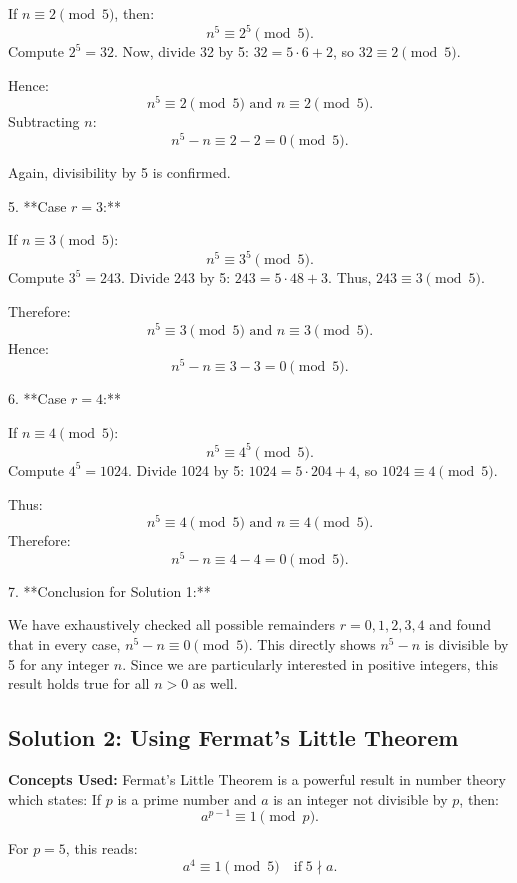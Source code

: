 \documentclass[12pt,a4paper]{article}
\begin{document}
   If $n \equiv 2 \pmod{5}$, then:
   \[
   n^5 \equiv 2^5 \pmod{5}.
   \]
   Compute $2^5=32$. Now, divide 32 by 5: $32=5\cdot6 + 2$, so $32 \equiv 2 \pmod{5}$.
   
   Hence:
   \[
   n^5 \equiv 2 \pmod{5} \text{ and } n \equiv 2 \pmod{5}.
   \]
   Subtracting $n$:
   \[
   n^5-n \equiv 2-2=0 \pmod{5}.
   \]

   Again, divisibility by 5 is confirmed.

   \medskip

5. **Case $r=3$:**
   
   If $n \equiv 3 \pmod{5}$:
   \[
   n^5 \equiv 3^5 \pmod{5}.
   \]
   Compute $3^5=243$. Divide 243 by 5: $243=5\cdot48 + 3$. Thus, $243 \equiv 3 \pmod{5}$.
   
   Therefore:
   \[
   n^5 \equiv 3 \pmod{5} \text{ and } n \equiv 3 \pmod{5}.
   \]
   Hence:
   \[
   n^5-n \equiv 3-3=0 \pmod{5}.
   \]

6. **Case $r=4$:**

\medskip
   
   If $n \equiv 4 \pmod{5}$:
   \[
   n^5 \equiv 4^5 \pmod{5}.
   \]
   Compute $4^5=1024$. Divide 1024 by 5: $1024=5\cdot204+4$, so $1024 \equiv 4 \pmod{5}$.
   
   Thus:
   \[
   n^5 \equiv 4 \pmod{5} \text{ and } n \equiv 4 \pmod{5}.
   \]
   Therefore:
   \[
   n^5-n \equiv 4-4=0 \pmod{5}.
   \]

7. **Conclusion for Solution 1:**

\medskip
   
   We have exhaustively checked all possible remainders $r=0,1,2,3,4$ and found that in every case, $n^5-n \equiv 0 \pmod{5}$. This directly shows $n^5-n$ is divisible by 5 for any integer $n$. Since we are particularly interested in positive integers, this result holds true for all $n>0$ as well.

\bigskip

\subsection*{Solution 2: Using Fermat’s Little Theorem}

\noindent\textbf{Concepts Used:}  
Fermat’s Little Theorem is a powerful result in number theory which states: If $p$ is a prime number and $a$ is an integer not divisible by $p$, then:
\[
a^{p-1} \equiv 1 \pmod{p}.
\]

For $p=5$, this reads:
\[
a^4 \equiv 1 \pmod{5} \quad \text{if} \; 5 \nmid a.
\]
\end{document}
